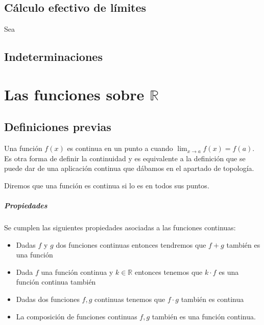 \section{Cálculo efectivo de límites}

Sea 

\section{Indeterminaciones}






\chapter{Las funciones sobre $\mathbb{R}$}
\minitoc

\newpage

\section{Definiciones previas}

\begin{defi}
Una función $f(x)$ es continua en un punto a cuando $\displaystyle \lim_{x\to a} f(x)=f(a)$. Es otra forma de definir la continuidad y es equivalente a la definición que se puede dar de una aplicación continua que dábamos en el apartado de topología. 
\end{defi}

\begin{defi}
Diremos que una función es continua si lo es en todos sus puntos. 
\end{defi}

\paragraph*{Propiedades}
Se cumplen las siguientes propiedades asociadas a las funciones continuas:
\begin{itemize}
\item Dadas $f$ y $g$ dos funciones continuas entonces tendremos que $f+g$ también es una función
\item Dada $f$ una función continua y $k\in \mathbb{R}$ entonces tenemos que $k\cdot f$ es una función continua también 
\item Dadas dos funciones $f, g$ continuas tenemos que $f\cdot g$ también es continua
\item La composición de funciones continuas $f,g$ también es una función  continua. 
\end{itemize}


